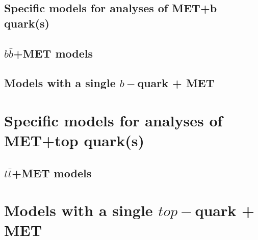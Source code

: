 \subsection{Specific models for analyses of MET+b quark(s)}

\subsection{$b \bar{b}$+MET models}

\subsection{Models with a single $b-$quark + MET}

\section{Specific models for analyses of MET+top quark(s)}

\subsection{$t \bar{t}$+MET models}

\section{Models with a single $top-$quark + MET}
